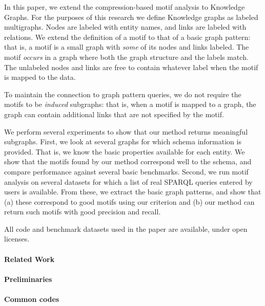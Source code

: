 \documentclass[11pt]{article}
\begin{document}
In this paper, we extend the compression-based motif analysis to Knowledge Graphs. For the purposes of this research we define Knowledge graphs as labeled multigraphs. Nodes are labeled with entity names, and links are labeled with relations. We extend the definition of a motif to that of a basic graph pattern: that is, a motif is a small graph with \emph{some} of its nodes and links labeled. The motif \emph{occurs} in a graph where both the graph structure and the labels match. The unlabeled nodes and links are free to contain whatever label when the motif is mapped to the data. 

To maintain the connection to graph pattern queries, we do not require the motifs to be \emph{induced} subgraphs: that is, when a motif is mapped to a graph, the graph can contain additional links that are not specified by the motif. 

We perform several experiments to show that our method returns meaningful subgraphs. First, we look at several graphs for which schema information is provided. That is, we know the basic properties available for each entity. We show that the motifs found by our method correspond well to the schema, and compare performance against several basic benchmarks. Second, we run motif analysis on several datasets for which a list of real SPARQL queries entered by users is available. From these, we extract the basic graph patterns, and show that (a) these correspond to good motifs using our criterion and (b) our method can return such motifs with good precision and recall.

All code and benchmark datasets used in the paper are available, under open licenses.\footnotemark



\paragraph{Related Work}

\paragraph{Preliminaries}


\paragraph{Common codes}
\end{document}
